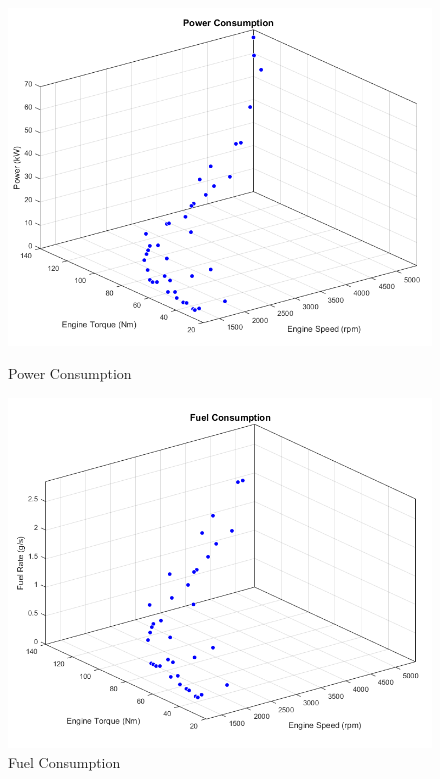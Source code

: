 \begin{figure}[h]
\centering
\begin{minipage}{.5\textwidth}
 	\centering
	\includegraphics[scale=0.36]{figures/power}
	\caption{Power Consumption}
	\label{fig:powerFit}
\end{minipage}%
\begin{minipage}{.5\textwidth}
  	\centering
	\includegraphics[scale=0.36]{figures/fuel}
  	\caption{Fuel Consumption}
  	\label{fig:fuelFit}
\end{minipage}
\end{figure}

